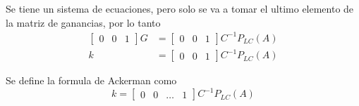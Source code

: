 Se tiene un sistema de ecuaciones, pero solo se va a tomar el ultimo elemento de la matriz de ganancias, por lo tanto
\[
    \begin{split}
        \begin{bmatrix}
            0 & 0 & 1    
        \end{bmatrix}
        G & = 
        \begin{bmatrix}
            0 & 0 & 1    
        \end{bmatrix}
        C^{-1}P_{LC}(A) \\
        k & =
        \begin{bmatrix}
            0 & 0 & 1
        \end{bmatrix}
        C^{-1}P_{LC}(A)
    \end{split}
\]

Se define la formula de Ackerman como
\[
    k = 
    \begin{bmatrix}
        0 & 0 & \ldots & 1
    \end{bmatrix}
    C^{-1}P_{LC}(A)
\]